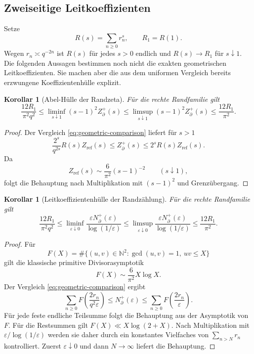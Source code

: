 \documentclass[11pt,a4paper]{article}
\newtheorem{corollary}[remark]{Korollar}
\begin{document}
\subsection{Zweiseitige Leitkoeffizienten}

Setze
\[
 R(s)=\sum_{n\ge0}r_n^s,
 \qquad R_1=R(1).
\]
Wegen $r_n\asymp q^{-2n}$ ist $R(s)$ für jedes $s>0$ endlich und
$R(s)\to R_1$ für $s\downarrow1$. Die folgenden Aussagen bestimmen
noch nicht die exakten geometrischen Leitkoeffizienten. Sie machen aber
die aus dem uniformen Vergleich bereits erzwungene Koeffizientenhülle
explizit.

\begin{corollary}[Abel-Hülle der Randzeta]
Für die rechte Randfamilie gilt
\[
 \frac{12R_1}{\pi^2q^2}
 \le
 \liminf_{s\downarrow1}(s-1)^2Z_\partial^+(s)
 \le
 \limsup_{s\downarrow1}(s-1)^2Z_\partial^+(s)
 \le
 \frac{12R_1}{\pi^2}.
\]
\end{corollary}

\begin{proof}
Der Vergleich \eqref{eq:geometric-comparison} liefert für $s>1$
\[
 \frac{2^s}{q^{2s}}R(s)Z_{\mathrm{ref}}(s)
 \le Z_\partial^+(s)
 \le 2^sR(s)Z_{\mathrm{ref}}(s).
\]
Da
\[
 Z_{\mathrm{ref}}(s)
 \sim\frac6{\pi^2}(s-1)^{-2}
 \qquad(s\downarrow1),
\]
folgt die Behauptung nach Multiplikation mit $(s-1)^2$ und
Grenzübergang.
\end{proof}

\begin{corollary}[Leitkoeffizientenhülle der Randzählung]
Für die rechte Randfamilie gilt
\[
 \frac{12R_1}{\pi^2q^2}
 \le
 \liminf_{\varepsilon\downarrow0}
 \frac{\varepsilon N_\partial^+(\varepsilon)}
 {\log(1/\varepsilon)}
 \le
 \limsup_{\varepsilon\downarrow0}
 \frac{\varepsilon N_\partial^+(\varepsilon)}
 {\log(1/\varepsilon)}
 \le
 \frac{12R_1}{\pi^2}.
\]
\end{corollary}

\begin{proof}
Für
\[
 F(X)=\#\{(u,v)\in\mathbb N^2:\gcd(u,v)=1,\ uv\le X\}
\]
gilt die klassische primitive Divisorasymptotik
\[
 F(X)\sim\frac6{\pi^2}X\log X.
\]
Der Vergleich \eqref{eq:geometric-comparison} ergibt
\[
 \sum_{n\ge0}F\!\left(\frac{2r_n}{q^2\varepsilon}\right)
 \le N_\partial^+(\varepsilon)
 \le
 \sum_{n\ge0}F\!\left(\frac{2r_n}{\varepsilon}\right).
\]
Für jede feste endliche Teilsumme folgt die Behauptung aus der
Asymptotik von $F$. Für die Restsummen gilt
$F(X)\ll X\log(2+X)$. Nach Multiplikation mit
$\varepsilon/\log(1/\varepsilon)$ werden sie daher durch ein
konstantes Vielfaches von $\sum_{n>N}r_n$ kontrolliert. Zuerst
$\varepsilon\downarrow0$ und dann $N\to\infty$ liefert die
Behauptung.
\end{proof}
\end{document}

